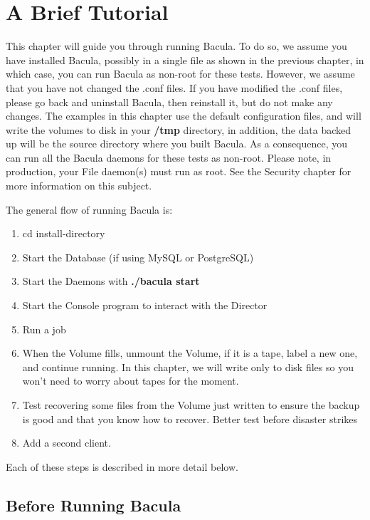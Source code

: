 
\section*{A Brief Tutorial}
\label{_ChapterStart1}

This chapter will guide you through running Bacula. To do so, we assume you
have installed Bacula, possibly in a single file as shown in the previous
chapter, in which case, you can run Bacula as non-root for these tests.
However, we assume that you have not changed the .conf files. If you have
modified the .conf files, please go back and uninstall Bacula, then reinstall
it, but do not make any changes. The examples in this chapter use the default
configuration files, and will write the volumes to disk in your {\bf /tmp}
directory, in addition, the data backed up will be the source directory where
you built Bacula. As a consequence, you can run all the Bacula daemons for
these tests as non-root. Please note, in production, your File daemon(s) must
run as root. See the Security chapter for more information on this subject. 

The general flow of running Bacula is: 

\begin{enumerate}
\item cd \lt{}install-directory\gt{}  
\item Start the Database (if using MySQL or PostgreSQL)  
\item Start the Daemons with {\bf ./bacula start}  
\item Start the Console program to interact with the Director  
\item Run a job  
\item When the Volume fills, unmount the Volume, if it is a  tape, label a new
   one, and continue running. In this  chapter, we will write only to disk files
   so you won't  need to worry about tapes for the moment. 
\item Test recovering some files from the Volume just written to  ensure the
   backup is good and that you know how to recover.  Better test before disaster
   strikes  
\item Add a second client. 
   \end{enumerate}

Each of these steps is described in more detail below. 

\subsection*{Before Running Bacula}

